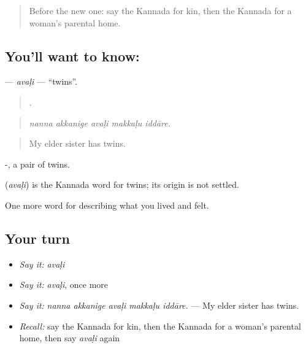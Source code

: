 \label{lesson:KA-C526-avali}



\begin{quote}
Before the new one: say the Kannada for kin, then the Kannada for a woman's parental home.
\end{quote}

\subsection*{You'll want to know: }
\textbf{} — \emph{avaḷi} — \textquotedblleft{}twins\textquotedblright{}.

\begin{quote}
    .
\end{quote}

\begin{quote}
\emph{nanna akkanige avaḷi makkaḷu iddāre.}
\end{quote}

\begin{quote}
My elder sister has twins.
\end{quote}

-, a pair of twins.

\begin{cousinweb}
\textbf{} (\emph{avaḷi}) is the Kannada word for twins; its origin is not settled.
\end{cousinweb}

\begin{grammarlens}[title={What you've built}]
One more word for describing what you lived and felt.
\end{grammarlens}

\subsection*{Your turn}
\begin{itemize}
\raggedright
  \item \emph{Say it:} \emph{avaḷi}
  \item \emph{Say it:} \emph{avaḷi}, once more
  \item \emph{Say it:} \emph{nanna akkanige avaḷi makkaḷu iddāre.} — My elder sister has twins.
  \item \emph{Recall:} say the Kannada for kin, then the Kannada for a woman's parental home, then say \emph{avaḷi} again
\end{itemize}

